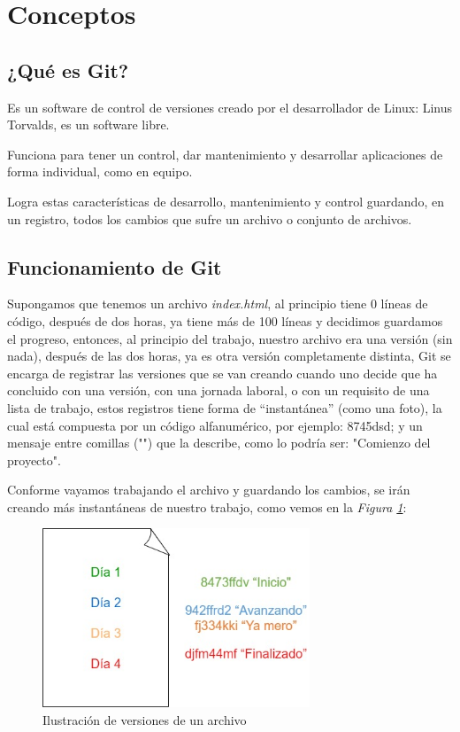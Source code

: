 \section{Conceptos}


\subsection{¿Qué es Git?}
\hspace{0.55cm}Es un software de control de versiones creado por el desarrollador de Linux: Linus Torvalds, es un software libre.

Funciona para tener un control, dar mantenimiento y desarrollar aplicaciones de forma individual, como en equipo.

Logra estas características de  desarrollo, mantenimiento y control guardando, en un registro, todos los cambios que sufre un archivo o conjunto de archivos.


\subsection{Funcionamiento de Git}
\hspace{0.55cm}Supongamos que tenemos un archivo \textit{index.html}, al principio tiene 0 líneas de código, después de dos horas, ya tiene más de 100 líneas y decidimos guardamos el progreso, entonces, al principio del trabajo, nuestro archivo era una versión (sin nada), después de las dos horas, ya es otra versión completamente distinta, Git se encarga de registrar las versiones que se van creando cuando uno decide que ha concluido con una versión, con una jornada laboral, o con un requisito de una lista de trabajo, estos registros tiene forma de “instantánea” (como una foto), la cual está compuesta por un código alfanumérico, por ejemplo: 8745dsd; y un mensaje entre comillas ("") que la describe, como lo podría ser: "Comienzo del proyecto".

Conforme vayamos trabajando el archivo y guardando los cambios, se irán creando más instantáneas de nuestro trabajo, como vemos en la \textit{Figura \ref{fig: 1}}:
\begin{figure}[H]
    \centering
    \caption{Ilustración de versiones de un archivo}
    \label{fig: 1}
    \includegraphics[width=8cm]{conceptos/g1.jpg}
\end{figure}


